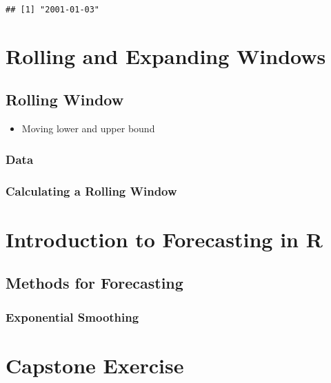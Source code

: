 \documentclass[
]{book}
\providecommand{\tightlist}{%
  \setlength{\itemsep}{0pt}\setlength{\parskip}{0pt}}
\begin{document}
\begin{verbatim}
## [1] "2001-01-03"
\end{verbatim}

\hypertarget{rolling-and-expanding-windows}{%
\chapter{Rolling and Expanding Windows}\label{rolling-and-expanding-windows}}

\hypertarget{rolling-window}{%
\section{Rolling Window}\label{rolling-window}}

\begin{itemize}
\tightlist
\item
  Moving lower and upper bound
\end{itemize}

\hypertarget{data}{%
\subsection{Data}\label{data}}

\hypertarget{calculating-a-rolling-window}{%
\subsection{Calculating a Rolling Window}\label{calculating-a-rolling-window}}

\hypertarget{introduction-to-forecasting-in-r}{%
\chapter{Introduction to Forecasting in R}\label{introduction-to-forecasting-in-r}}

\hypertarget{methods-for-forecasting}{%
\section{Methods for Forecasting}\label{methods-for-forecasting}}

\hypertarget{exponential-smoothing}{%
\subsection{Exponential Smoothing}\label{exponential-smoothing}}

\hypertarget{capstone-exercise}{%
\chapter{Capstone Exercise}\label{capstone-exercise}}
\end{document}

